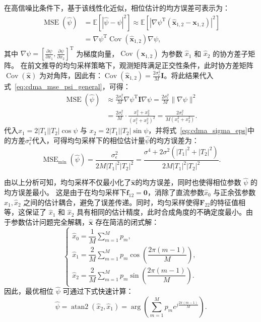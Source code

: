 在高信噪比条件下，基于该线性化近似，相位估计的均方误差可表示为：
\begin{align}
	\operatorname{MSE}(\hat{\psi})
	&= \mathbb{E}[|\hat{\psi} - \psi|^2]
	\approx \mathbb{E}\left[ \left| \nabla\psi^{\mathrm{T}} (\hat{\bm{x}}_{1,2} - \bm{x}_{1,2}) \right|^2 \right] \\
	&= \nabla\psi^{\mathrm{T}} \operatorname{Cov}(\hat{\bm{x}}_{1,2}) \nabla\psi,\label{eq:cdma_mse_psi_general}
\end{align}
其中 $\nabla \psi = [\frac{\partial \psi}{\partial x_1}, \frac{\partial \psi}{\partial x_2}]^{\mathrm{T}}$ 为梯度向量，$\operatorname{Cov}(\hat{\bm{x}}_{1,2})$ 为参数 $\hat{x}_1$ 和 $\hat{x}_2$ 的协方差子矩阵。
在前文推导的均匀采样策略下，观测矩阵满足正交性条件，此时协方差矩阵 $\operatorname{Cov}(\hat{\bm x})$ 为对角阵，因此有：$\operatorname{Cov}(\hat{\bm{x}}_{1,2}) =\frac{2\sigma_\epsilon^2}{M} \bm{I}$。将此结果代入式~\eqref{eq:cdma_mse_psi_general}，可得：
\begin{align}
	\operatorname{MSE}(\hat{\psi})&\approx \frac{2\sigma_\epsilon^2}{M} \nabla\psi^{\mathrm{T}} \bm{I} \nabla\psi= \frac{2\sigma_\epsilon^2}{M} \|\nabla\psi\|^2 \\
	&= \frac{2\sigma_\epsilon^2}{M} \cdot \frac{x_1^2 + x_2^2}{(x_1^2 + x_2^2)^2}= \frac{2\sigma_\epsilon^2}{M(x_1^2 + x_2^2)}.
\end{align}
代入$x_1 = 2|T_1||T_2| \cos\psi$ 与 $x_2 = 2|T_1||T_2| \sin\psi$，并将式~\eqref{eq:cdma_sigma_eps}中的方差$\sigma_\epsilon^2$代入，可得均匀采样下的相位估计量$\hat{\psi}$的均方误差为：
\begin{equation}\label{eq:cdma_mse_psi_final}
	\operatorname{MSE}_{\min}(\hat{\psi}) = \frac{\sigma_\epsilon^2}{2 M |T_1|^2 |T_2|^2} = \frac{\sigma^4 + 2\sigma^2(|T_1|^2 + |T_2|^2)}{2 M |T_1|^2 |T_2|^2}.
\end{equation}


由以上分析可知，均匀采样不仅最小化了$\hat{\bm x}$的均方误差，同时也使得相位参数 $\hat{\psi}$ 的均方误差最小。
这是由于在均匀采样下$\bm f_{12} = \mathbf{0}$，消除了直流参数$\hat{x}_0$ 与正余弦参数 $\hat{x}_1, \hat{x}_2$ 之间的估计耦合，避免了误差传递。同时，均匀采样使得$\bm F_{22}$的特征值相等，这保证了 $\hat{x}_1$ 和 $\hat{x}_2$ 具有相同的估计精度，此时合成角度的不确定度最小。由于参数估计问题完全解耦，$\hat{\bm x}$ 存在简洁的闭式解：
\begin{equation}\label{eq:cdma_hatbmx}
	\begin{cases}
		\hat{x}_0 = \dfrac{1}{M} \displaystyle\sum_{m=1}^{M} p_m, \\
		\hat{x}_1 = \dfrac{2}{M} \displaystyle\sum_{m=1}^{M} p_m \cos\left(\dfrac{2\pi (m-1)}{M}\right), \\
		\hat{x}_2 = \dfrac{2}{M} \displaystyle\sum_{m=1}^{M} p_m \sin\left(\dfrac{2\pi (m-1)}{M}\right).
	\end{cases}
\end{equation}
因此，最优相位 $\hat{\psi}$ 可通过下式快速计算：
\begin{equation}\label{eq:cdma_hatpsi}
	\hat{\psi} = \operatorname{atan2}(\hat{x}_2, \hat{x}_1) = \arg\left( \sum_{m=1}^{M} p_m e^{j \frac{2\pi (m-1)}{M}} \right).
\end{equation}

